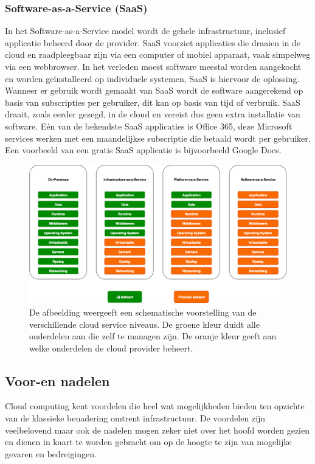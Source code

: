 \subsubsection{Software-as-a-Service (SaaS)}
In het Software-as-a-Service model wordt de gehele infrastructuur, inclusief applicatie beheerd door de provider. SaaS voorziet applicaties die draaien in de cloud en raadpleegbaar zijn via een computer of mobiel apparaat, vaak simpelweg via een webbrowser. In het verleden moest software meestal worden aangekocht en worden geïnstalleerd op individuele systemen, SaaS is hiervoor de oplossing. Wanneer er gebruik wordt gemaakt van SaaS wordt de software aangerekend op basis van subscripties per gebruiker, dit kan op basis van tijd of verbruik. SaaS draait, zoals eerder gezegd, in de cloud en vereist dus geen extra installatie van software. Eén van de bekendste SaaS applicaties is Office 365, deze Microsoft services werken met een maandelijkse subscriptie die betaald wordt per gebruiker. Een voorbeeld van een gratis SaaS applicatie is bijvoorbeeld Google Docs.
\begin{figure}
    \includegraphics[width=1\textwidth]{img/cloud_service_level.png}
    \caption{De afbeelding weergeeft een schematische voorstelling van de verschillende cloud service niveaus. De groene kleur duidt alle onderdelen aan die zelf te managen zijn. De oranje kleur geeft aan welke onderdelen de cloud provider beheert.} 
    \label{fig:cloud-service-levels}  
\end{figure}
\newline

\subsection{Voor-en nadelen}
\label{voor-en-nadelen}
Cloud computing kent voordelen die heel wat mogelijkheden bieden ten opzichte van de klassieke benadering omtrent infrastructuur. \autocite{Azure2019} De voordelen zijn veelbelovend maar ook de nadelen mogen zeker niet over het hoofd worden gezien en dienen in kaart te worden gebracht om op de hoogte te zijn van mogelijke gevaren en bedreigingen.\autocite{Sosinsky2011} 

